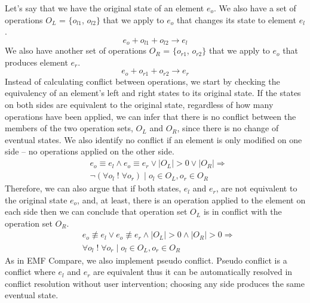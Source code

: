 Let's say that we have the original state of an element $e_{o}$. We also have a set of operations $O_{L}$ = $\{$$o_{l1}$, $o_{l2}$$\}$ that we apply to $e_{o}$ that changes its state to element $e_{l}$. 
\begin{equation} \label{eq:conflict_3.1}
e_{o} + o_{l1} + o_{l2} \rightarrow e_{l}
\end{equation} 
We also have another set of operations $O_{R}$ = $\{$$o_{r1}$, $o_{r2}$$\}$ that we apply to $e_{o}$ that produces element $e_{r}$.
\begin{equation} \label{eq:conflict_3.2}
e_{o} + o_{r1} + o_{r2} \rightarrow e_{r}
\end{equation} 
Instead of calculating conflict between operations, we start by checking the equivalency of an element's left and right states to its original state. If the states on both sides are equivalent to the original state, regardless of how many operations have been applied, we can infer that there is no conflict between the members of the two operation sets, $O_{L}$ and $O_{R}$, since there is no change of eventual states. We also identify no conflict if an element is only modified on one side -- no operations applied on the other side.
\begin{equation} \label{eq:conflict_3.3}
\begin{split}
& e_{o} \equiv e_{l} \wedge e_{o} \equiv e_{r} \vee |O_{L}| > 0 \vee |O_{R}| \Rightarrow\\
& \neg(\forall o_{l} \;!\; \forall o_{r}) \;|\; o_{l} \in O_{L}, o_{r} \in O_{R}
\end{split}
\end{equation} 
Therefore, we can also argue that if both states, $e_{l}$ and $e_{r}$, are not equivalent to the original state $e_{o}$, and, at least, there is an operation applied to the element on each side then we can conclude that operation set $O_{L}$ is in conflict with the operation set $O_{R}$.
\begin{equation} \label{eq:conflict_3.4}
\begin{split}
& e_{o} \not\equiv e_{l} \vee e_{o} \not\equiv e_{r} \wedge |O_{L}| > 0 \wedge |O_{R}| > 0 \Rightarrow\\
& \forall o_{l} \;!\; \forall o_{r} \;|\; o_{l} \in O_{L}, o_{r} \in O_{R}
\end{split}
\end{equation} 
As in EMF Compare, we also implement pseudo conflict. Pseudo conflict is a conflict where $e_{l}$ and $e_{r}$ are equivalent thus it can be automatically resolved in conflict resolution without user intervention; choosing any side produces the same eventual state.
